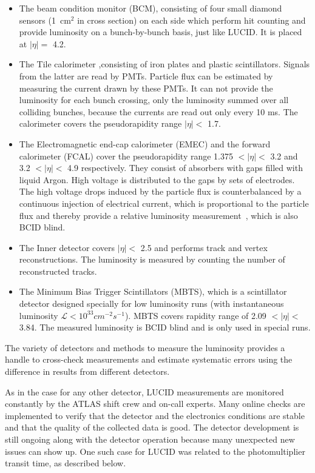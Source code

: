 \begin{itemize}
 \item The beam condition monitor (BCM), consisting of four small diamond sensors (1~cm$^2$ in cross section) on each side
 which perform hit counting and provide luminosity on a bunch-by-bunch basis, just like LUCID. It is placed at $|\eta| = $ 4.2.
 \item The Tile calorimeter ,consisting of iron plates and plastic scintillators. 
 Signals from the latter are read by PMTs. Particle flux can be estimated by measuring the current drawn by these PMTs. 
 It can not provide the luminosity for each bunch crossing, only the luminosity summed over all colliding bunches, because the currents are read out only every 10 ms. 
 The calorimeter covers the pseudorapidity range $|\eta| < $ 1.7.
 \item The Electromagnetic end-cap calorimeter (EMEC) and the forward calorimeter (FCAL) cover the pseudorapidity range 1.375 $< |\eta| < $ 3.2 and 3.2 $< |\eta| < $ 4.9 respectively. 
 They consist of absorbers with gaps filled with liquid Argon. High voltage is distributed to the gaps by sets of electrodes.
 The high voltage drops induced by the particle flux is counterbalanced by a continuous injection of electrical current, which is proportional to the particle flux and thereby provide a 
 relative luminosity measurement~\cite{Aaboud:2016hhf}, which is also BCID blind. 
 \item The Inner detector covers $|\eta| < $ 2.5 and performs track and vertex reconstructions. 
 The luminosity is measured by counting the number of reconstructed tracks.
 \item The Minimum Bias Trigger Scintillators (MBTS), which is a scintillator detector designed specially 
 for low luminosity runs (with instantaneous luminosity $\mathscr{L} < 10^{33} cm^{-2}s^{-1}$). 
 MBTS covers rapidity range of 2.09 $< |\eta| < $ 3.84. The measured luminosity is BCID blind and is only used in special runs.
\end{itemize}

The variety of detectors and methods to measure the luminosity provides a handle to cross-check measurements and estimate systematic errors 
using the difference in results from different detectors.

As in the case for any other detector, LUCID measurements are monitored constantly by the ATLAS shift crew and on-call experts. 
Many online checks are implemented to verify that the detector and the electronics conditions are stable and that the quality of the collected data is good. 
The detector development is still ongoing along with the detector operation because many unexpected new issues can show up. 
One such case for LUCID was related to the photomultiplier transit time, as described below. 

